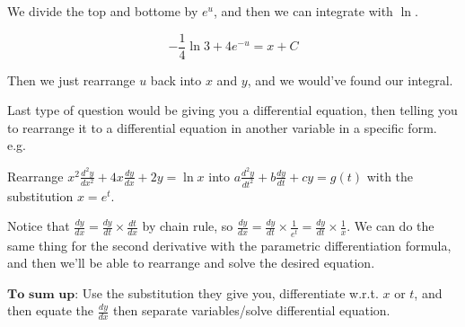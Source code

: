 \documentclass{article}
\newcommand{\f}[2]{\frac{#1}{#2}}
\newcommand{\dd}[2]{\frac{d #1}{d #2}}
\theoremstyle{mytheoremstyle}
\theoremstyle{mytheoremstyle}
\theoremstyle{myproblemstyle}
\theoremstyle{myproblemstyle}
\begin{document}
    We divide the top and bottome by $e^u$, and then we can integrate with $\ln{}$.

    \[-\f{1}{4} \ln{3 + 4e^{-u}} = x + C\]

    Then we just rearrange $u$ back into $x$ and $y$, and we would've found our integral.

    Last type of question would be giving you a differential equation, then telling you to rearrange it to a differential equation in another variable in a specific form. e.g.

    \begin{example}
        Rearrange $x^2 \f{d^2y}{dx^2} + 4x\dd{y}{x} + 2y = \ln{x}$ into $a\f{d^2y}{dt^2} + b \dd{y}{t} + cy = g(t)$ with the substitution $x = e^t$.
    \end{example}

    Notice that $\dd{y}{x} = \dd{y}{t} \times \dd{t}{x}$ by chain rule, so $\dd{y}{x} = \dd{y}{t} \times \f{1}{e^t} = \dd{y}{t} \times \f{1}{x}$. We can do the same thing for the second derivative with the parametric differentiation formula, and then we'll be able to rearrange and solve the desired equation.

    $\textbf{To sum up:}$ Use the substitution they give you, differentiate w.r.t. $x$ or $t$, and then equate the $\dd{y}{x}$ then separate variables/solve differential equation.
\end{document}
